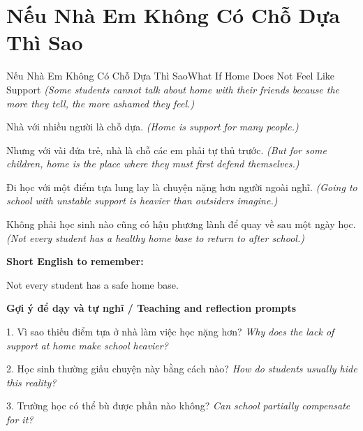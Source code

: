 \section{Nếu Nhà Em Không Có Chỗ Dựa Thì Sao}
\begin{truyen}{Nếu Nhà Em Không Có Chỗ Dựa Thì Sao}{What If Home Does Not Feel Like Support}
\textit{(Some students cannot talk about home with their friends because the more they tell, the more ashamed they feel.)}

Nhà với nhiều người là chỗ dựa.
\textit{(Home is support for many people.)}

Nhưng với vài đứa trẻ, nhà là chỗ các em phải tự thủ trước.
\textit{(But for some children, home is the place where they must first defend themselves.)}

Đi học với một điểm tựa lung lay là chuyện nặng hơn người ngoài nghĩ.
\textit{(Going to school with unstable support is heavier than outsiders imagine.)}

\end{truyen}

\begin{baihoc}
Không phải học sinh nào cũng có hậu phương lành để quay về sau một ngày học.
\textit{(Not every student has a healthy home base to return to after school.)}
\end{baihoc}

\begin{ghinhoanh}
\textbf{Short English to remember:}

Not every student has a safe home base.

\end{ghinhoanh}

\begin{tuhocnhanh}
\textbf{Gợi ý để dạy và tự nghĩ / Teaching and reflection prompts}

1. Vì sao thiếu điểm tựa ở nhà làm việc học nặng hơn? \textit{Why does the lack of support at home make school heavier?}

2. Học sinh thường giấu chuyện này bằng cách nào? \textit{How do students usually hide this reality?}

3. Trường học có thể bù được phần nào không? \textit{Can school partially compensate for it?}
\end{tuhocnhanh}
\ngancach

